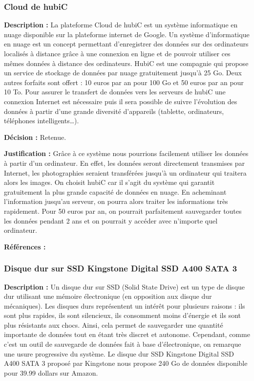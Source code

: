 \subsubsection{Cloud de hubiC}
\textbf{Description :} La plateforme Cloud de hubiC est un système informatique en nuage disponible sur la plateforme internet de Google. Un système d’informatique en nuage est un concept permettant d’enregistrer des données sur des ordinateurs localisés à distance grâce à une connexion en ligne et de pouvoir utiliser ces mêmes données à distance des ordinateurs. HubiC est une compagnie qui propose un service de stockage de données par nuage gratuitement jusqu’à 25 Go. Deux autres forfaits sont offert : 10 euros par an pour 100 Go et 50 euros par an pour 10 To. Pour assurer le transfert de données vers les serveurs de hubiC une connexion Internet est nécessaire puis il sera possible de suivre l’évolution des données à partir d’une grande diversité d’appareils (tablette, ordinateurs, téléphones intelligents…). 

\textbf{Décision :} Retenue.

\textbf{Justification :} Grâce à ce système nous pourrions facilement utiliser les données à partir d’un ordinateur. En effet, les données seront directement transmises par Internet, les photographies seraient transférées jusqu’à un ordinateur qui traitera alors les images. On choisit hubiC car il s’agit du système qui garantit gratuitement la plus grande capacité de données en nuage.  En acheminant l’information jusqu’au serveur, on pourra alors traiter les informations très rapidement. Pour 50 euros par an, on pourrait parfaitement sauvegarder toutes les données pendant 2 ans et on pourrait y accéder avec n’importe quel ordinateur.

\textbf{Références :} \cite{hubic} \cite{clgo} \cite{incl}

\subsubsection{Disque dur sur SSD Kingstone Digital SSD A400 SATA 3 }
\textbf{Description :} Un disque dur sur SSD (Solid State Drive) est un type de disque dur utilisant une mémoire électronique (en opposition aux disque dur mécaniques). Les disques durs représentent un intérêt pour plusieurs raisons : ils sont plus rapides, ils sont silencieux, ils consomment moins d’énergie et ils sont plus résistants aux chocs. Ainsi, cela permet de sauvegarder une quantité importante de données tout en étant très discret et autonome. Cependant, comme c’est un outil de sauvegarde de données fait à base d’électronique, on remarque une usure progressive du système. Le disque dur SSD Kingstone Digital SSD A400 SATA 3 proposé par Kingstone nous propose 240 Go de données disponible pour 39.99 dollars sur Amazon. 

